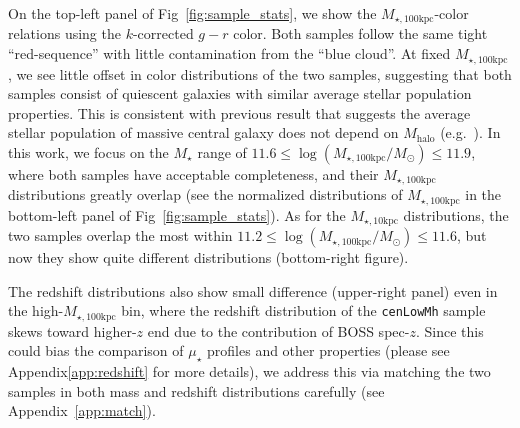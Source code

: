 \documentclass{emulateapj}
\def\nbcg{\texttt{cenLowMh}}
\def\mstar{{$M_{\star}$}}
\def\mhalo{{$M_{\mathrm{halo}}$}}
\def\minn{{$M_{\star,10\mathrm{kpc}}$}}
\def\mtot{{$M_{\star,100\mathrm{kpc}}$}}
\def\logmtot{{$\log (M_{\star,100\mathrm{kpc}}/M_{\odot})$}}
\def\mden{{$\mu_{\star}$}}
\begin{document}
\begin{CJK*}{UTF8}{gbsn}
    On the top-left panel of Fig~\ref{fig:sample_stats}, we show the \mtot{}-color 
    relations using the $k$-corrected $g-r$ color. 
    Both samples follow the same tight ``red-sequence'' with little contamination 
    from the ``blue cloud''.
    At fixed \mtot{}, we see little offset in color distributions of the two 
    samples, suggesting that both samples consist of quiescent galaxies with 
    similar average stellar population properties.  
    This is consistent with previous result that suggests the average stellar 
    population of massive central galaxy does not depend on \mhalo{} 
    (e.g.\ \citealt{Park2007}).  
    In this work, we focus on the \mstar{} range of $11.6 \le$\logmtot{}$\le 11.9$, 
    where both samples have acceptable completeness, and their \mtot{} distributions 
    greatly overlap (see the normalized distributions of \mtot{} in the bottom-left 
    panel of Fig~\ref{fig:sample_stats}). 
    As for the \minn{} distributions, the two samples overlap the most within 
    $11.2 \le$\logmtot{}$\le 11.6$, but now they show quite different
    distributions (bottom-right figure).
    
    The redshift distributions also show small difference
    (upper-right panel) even in the high-\mtot{} bin, where the redshift distribution 
    of the \nbcg{} sample skews toward higher-$z$ end due to the contribution of BOSS 
    spec-$z$.
    Since this could bias the comparison of \mden{} profiles and other properties 
    (please see Appendix\ref{app:redshift} for more details), we address this via matching 
    the two samples in both mass and redshift distributions carefully
    (see Appendix~\ref{app:match}).
    

\end{CJK*}
\end{document}
